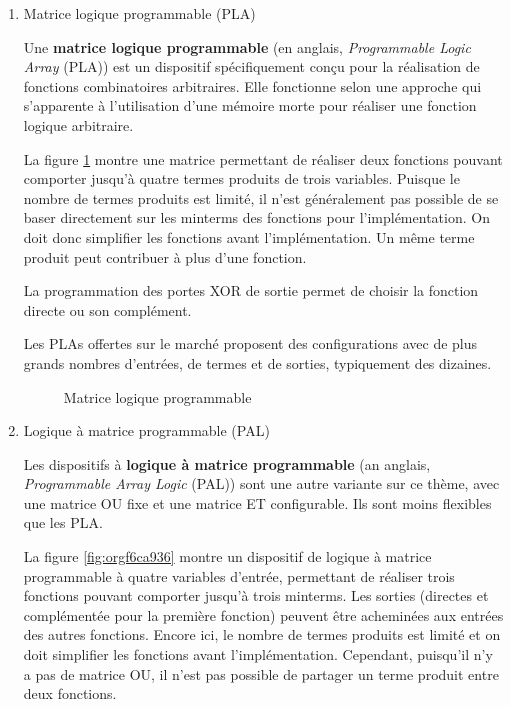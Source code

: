 \documentclass[letter, oneside]{book}
\begin{document}
\begin{enumerate}
\item Matrice logique programmable (PLA)
\label{sec:orgec36f54}

Une \textbf{matrice logique programmable} (en anglais, \emph{Programmable Logic
Array} (PLA)) est un dispositif spécifiquement conçu pour la
réalisation de fonctions combinatoires arbitraires. Elle fonctionne
selon une approche qui s'apparente à l'utilisation d'une mémoire morte
pour réaliser une fonction logique arbitraire.

La figure \ref{fig:org8914e37} montre une matrice permettant de
réaliser deux fonctions pouvant comporter jusqu'à quatre termes
produits de trois variables. Puisque le nombre de termes produits est
limité, il n'est généralement pas possible de se baser directement sur
les minterms des fonctions pour l'implémentation. On doit donc
simplifier les fonctions avant l'implémentation. Un même terme produit
peut contribuer à plus d'une fonction.

La programmation des portes XOR de sortie permet de choisir
la fonction directe ou son complément. 

Les PLAs offertes sur le marché proposent des configurations avec de
plus grands nombres d'entrées, de termes et de sorties, typiquement
des dizaines.

\begin{figure}[htbp]
\centering

\caption{\label{fig:org8914e37}Matrice logique programmable}
\end{figure}

\item Logique à matrice programmable (PAL)
\label{sec:org98bb024}

Les dispositifs à \textbf{logique à matrice programmable} (an anglais,
\emph{Programmable Array Logic} (PAL)) sont une autre variante sur ce
thème, avec une matrice OU fixe et une matrice ET configurable. Ils
sont moins flexibles que les PLA.

La figure \ref{fig:orgf6ca936} montre un dispositif de logique à matrice
programmable à quatre variables d'entrée, permettant de réaliser trois
fonctions pouvant comporter jusqu'à trois minterms. Les sorties
(directes et complémentée pour la première fonction) peuvent être
acheminées aux entrées des autres fonctions. Encore ici, le nombre de
termes produits est limité et on doit simplifier les fonctions avant
l'implémentation. Cependant, puisqu'il n'y a pas de matrice OU, il
n'est pas possible de partager un terme produit entre deux fonctions.


\end{enumerate}
\end{document}
